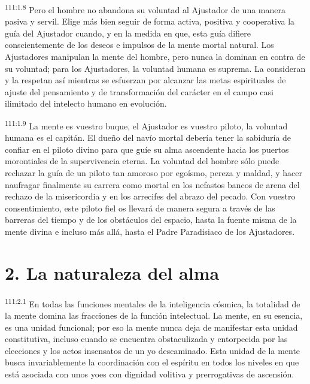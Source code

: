 \documentclass[twoside, 11pt]{book}
\begin{document}
\par
\textsuperscript{111:1.8} Pero el hombre no abandona su voluntad al Ajustador de una manera pasiva y servil. Elige más bien seguir de forma activa, positiva y cooperativa la guía del Ajustador cuando, y en la medida en que, esta guía difiere conscientemente de los deseos e impulsos de la mente mortal natural. Los Ajustadores manipulan la mente del hombre, pero nunca la dominan en contra de su voluntad; para los Ajustadores, la voluntad humana es suprema. La consideran y la respetan así mientras se esfuerzan por alcanzar las metas espirituales de ajuste del pensamiento y de transformación del carácter en el campo casi ilimitado del intelecto humano en evolución.

\par
\textsuperscript{111:1.9} La mente es vuestro buque, el Ajustador es vuestro piloto, la voluntad humana es el capitán. El dueño del navío mortal debería tener la sabiduría de confiar en el piloto divino para que guíe su alma ascendente hacia los puertos morontiales de la supervivencia eterna. La voluntad del hombre sólo puede rechazar la guía de un piloto tan amoroso por egoísmo, pereza y maldad, y hacer naufragar finalmente su carrera como mortal en los nefastos bancos de arena del rechazo de la misericordia y en los arrecifes del abrazo del pecado. Con vuestro consentimiento, este piloto fiel os llevará de manera segura a través de las barreras del tiempo y de los obstáculos del espacio, hasta la fuente misma de la mente divina e incluso más allá, hasta el Padre Paradisiaco de los Ajustadores.

\section*{2. La naturaleza del alma}
\par
\textsuperscript{111:2.1} En todas las funciones mentales de la inteligencia cósmica, la totalidad de la mente domina las fracciones de la función intelectual. La mente, en su esencia, es una unidad funcional; por eso la mente nunca deja de manifestar esta unidad constitutiva, incluso cuando se encuentra obstaculizada y entorpecida por las elecciones y los actos insensatos de un yo descaminado. Esta unidad de la mente busca invariablemente la coordinación con el espíritu en todos los niveles en que está asociada con unos yoes con dignidad volitiva y prerrogativas de ascensión.
\end{document}
